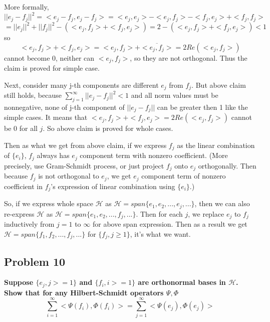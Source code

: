 \documentclass{article}
\begin{document}
More formally,
\[||e_j-f_j||^2=<e_j-f_j, e_j-f_j>=<e_j, e_j>-<e_j,f_j>-<f_j,e_j>+<f_j,f_j>\]
\[=||e_j||^2+||f_j||^2-(<e_j,f_j>+<f_j,e_j>) = 2-(<e_j,f_j>+<f_j,e_j>) < 1\]
so
\[<e_j,f_j>+<f_j,e_j>=<e_j,f_j>+\overline{<e_j,f_j>}=2Re(<e_j,f_j>)\] cannot become 0,
neither can $<e_j,f_j>$, so they are not orthogonal. Thus the claim is proved for simple case.

Next, consider many j-th components are different $e_j$ from $f_j$. But above claim still holds, because
\(\sum_{j=1}^\infty ||e_j-f_j||^2<1\) and all norm values must be nonnegative,
none of j-th component of $||e_j-f_j||$ can be greater then 1 like the simple cases. 
It means that $<e_j,f_j>+<f_j,e_j>=2Re(<e_j,f_j>)$ cannot be 0 for all $j$.
So above claim is proved for whole cases.


Then as what we get from above claim, if we express $f_j$ as the linear combination of $\{e_i\}$, 
$f_j$ always has $e_j$ component term with nonzero coefficient.
(More precisely, use Gram-Schmidt process, or just project $f_j$ onto $e_j$ orthogonally.
Then because $f_j$ is not orthogonal to $e_j$,
we get $e_j$ component term of nonzero coefficient in $f_j$'s expression of linear combination using $\{e_i\}$.)

So, if we express whole space $\mathcal{H}$ as \(\mathcal{H}=span\{e_1,e_2,...,e_j,...\}\), then
we can also re-express $\mathcal{H}$ as \(\mathcal{H}=span\{e_1,e_2,...,f_j,...\}\).
Then for each $j$, we replace $e_j$ to $f_j$ inductively from $j=1$ to $\infty$ for above span expression.
Then as a result we get \(\mathcal{H}=span\{f_1,f_2,...,f_j,...\}\) for $\{f_j, j\geq 1\}$, it's what we want.




\subsection{Problem 10}
\textbf{
    Suppose $\{e_j,j>=1\}$ and $\{f_i,i>=1\}$ are orthonormal bases in $\mathcal{H}$.
    Show that for any Hilbert-Schmidt operators $\Psi,\Phi$
    \[\sum_{i=1}^{\infty} <\Psi(f_i), \Phi(f_i)> = \sum_{j=1}^{\infty} <\Psi(e_j),\Phi(e_j)>\]
}
\end{document}
